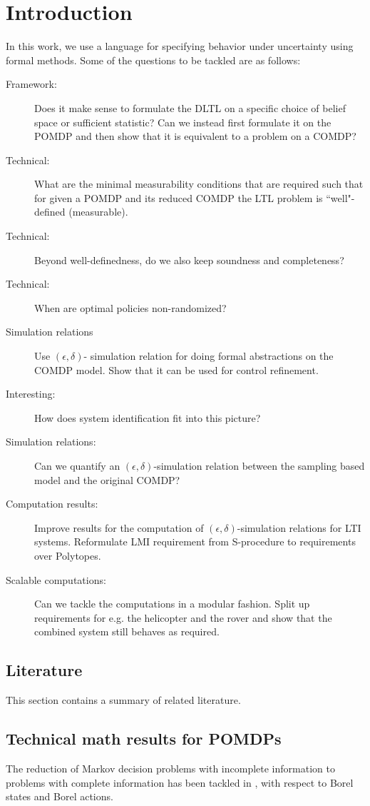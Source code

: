 \documentclass{ifacconf}
\begin{document}
\section{Introduction} \label{subsec:intro}
In this work, we use a language for specifying behavior under uncertainty using formal methods. 
Some of the questions to be tackled are as follows:
\begin{description}
	\item[Framework:] Does it make sense to formulate the DLTL on a specific choice of belief space or sufficient statistic? Can we instead first formulate it on the POMDP and then show that it  is equivalent to a problem on a COMDP?
	\item[Technical:]  What are the minimal measurability conditions that are required such that for given a POMDP and its reduced COMDP  the LTL problem is ``well"-defined (measurable).
	\item[Technical:] Beyond well-definedness, do we also keep soundness and completeness?
	\item[Technical:] When are optimal policies non-randomized?
	\item[Simulation relations]  Use $(\epsilon,\delta)$- simulation relation for doing formal abstractions on the COMDP model.
	Show that it can be used for control refinement.
	\item[Interesting:] How does system identification fit into this picture?
	\item[Simulation relations:] Can we quantify an $(\epsilon,\delta)$-simulation relation between the sampling based model and the original COMDP?
	\item[Computation results:] Improve results for the computation of $(\epsilon,\delta)$-simulation relations for LTI systems. Reformulate LMI requirement from S-procedure to requirements over Polytopes. 
	\item[Scalable computations:] Can we  tackle the computations in a modular fashion. Split up requirements for e.g. the helicopter and the rover and show that the combined system still behaves as required.
	 
\end{description}


\subsection{Literature}
This section contains a summary of related literature.

\subsection{Technical math results for POMDPs}
The reduction of Markov decision problems with incomplete information to problems with complete information has been tackled in
\cite{yushkevich_reduction_1976,rhenius_incomplete_1974}, with respect to Borel states and Borel actions.
\end{document}
